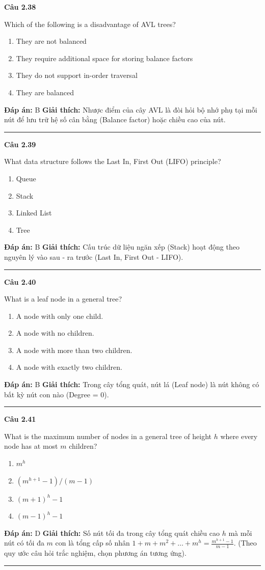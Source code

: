 \documentclass[11pt,a4paper]{article}
\newenvironment{question}[1]{%
  \par\vspace{1em}\noindent\textbf{\large Câu #1}\par\vspace{0.4em}
}{%
  \par\vspace{1em}\hrule\vspace{0.6em}
}
\newenvironment{choices}{%
  \begin{enumerate}[label=\textbf{\Alph*.},leftmargin=2.2em,itemsep=2pt,topsep=3pt]
}{%
  \end{enumerate}
}
\newcommand{\choice}{\item}
\begin{document}
\begin{question}{2.38}
Which of the following is a disadvantage of AVL trees?
\begin{choices}
\choice They are not balanced
\choice They require additional space for storing balance factors
\choice They do not support in-order traversal
\choice They are balanced
\end{choices}
\textbf{Đáp án:} B
\textbf{Giải thích:} Nhược điểm của cây AVL là đòi hỏi bộ nhớ phụ tại mỗi nút để lưu trữ hệ số cân bằng (Balance factor) hoặc chiều cao của nút.
\end{question}

\begin{question}{2.39}
What data structure follows the Last In, First Out (LIFO) principle?
\begin{choices}
\choice Queue
\choice Stack
\choice Linked List
\choice Tree
\end{choices}
\textbf{Đáp án:} B
\textbf{Giải thích:} Cấu trúc dữ liệu ngăn xếp (Stack) hoạt động theo nguyên lý vào sau - ra trước (Last In, First Out - LIFO).
\end{question}

\begin{question}{2.40}
What is a leaf node in a general tree?
\begin{choices}
\choice A node with only one child.
\choice A node with no children.
\choice A node with more than two children.
\choice A node with exactly two children.
\end{choices}
\textbf{Đáp án:} B
\textbf{Giải thích:} Trong cây tổng quát, nút lá (Leaf node) là nút không có bất kỳ nút con nào (Degree = 0).
\end{question}

\begin{question}{2.41}
What is the maximum number of nodes in a general tree of height $h$ where every node has at most $m$ children?
\begin{choices}
\choice $m^h$
\choice $(m^{h+1} - 1)/(m - 1)$
\choice $(m + 1)^h - 1$
\choice $(m - 1)^h - 1$
\end{choices}
\textbf{Đáp án:} D
\textbf{Giải thích:} Số nút tối đa trong cây tổng quát chiều cao $h$ mà mỗi nút có tối đa $m$ con là tổng cấp số nhân $1 + m + m^2 + \dots + m^h = \frac{m^{h+1} - 1}{m - 1}$. (Theo quy ước câu hỏi trắc nghiệm, chọn phương án tương ứng).
\end{question}
\end{document}
